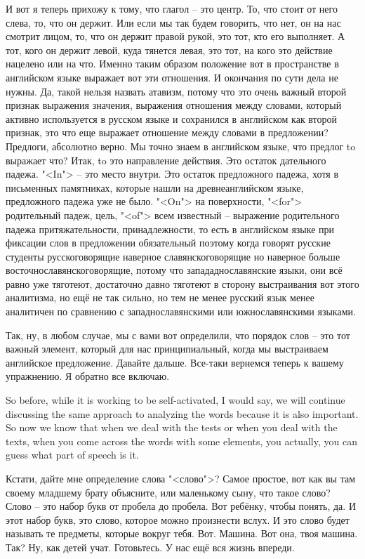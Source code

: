\documentclass[main.tex]{subfiles}
\begin{document}
И вот я теперь прихожу к тому, что глагол -- это центр.
То, что стоит от него слева, то, что он держит.
Или если мы так будем говорить, что нет, он на нас смотрит лицом, то, что он держит правой рукой, это тот, кто его выполняет.
А тот, кого он держит левой, куда тянется левая, это тот, на кого это действие нацелено или на что.
Именно таким образом положение вот в пространстве в английском языке выражает вот эти отношения.
И окончания по сути дела не нужны.
Да, такой нельзя назвать атавизм, потому что это очень важный второй признак выражения значения, выражения отношения между словами, который активно используется в русском языке и сохранился в английском как второй признак, это что еще выражает отношение между словами в предложении?
Предлоги, абсолютно верно.
Мы точно знаем в английском языке, что предлог to выражает что? 
Итак, to это направление действия.
Это остаток дательного падежа.
"<In"> -- это место внутри.
Это остаток предложного падежа, хотя в письменных памятниках, которые нашли на древнеанглийском языке, предложного падежа уже не было.
"<On"> на поверхности, "<for"> родительный падеж, цель, "<of"> всем известный -- выражение родительного падежа притяжательности, принадлежности, то есть в английском языке при фиксации слов в предложении обязательный поэтому когда говорят русские студенты русскоговорящие наверное славянскоговорящие но наверное больше восточнославянскоговорящие, потому что запададнославянские языки, они всё равно уже тяготеют, достаточно давно тяготеют в сторону выстраивания вот этого аналитизма, но ещё не так сильно, но тем не менее русский язык менее аналитичен по сравнению с западнославянскими или южнославянскими языками.

Так, ну, в любом случае, мы с вами вот определили, что порядок слов – это тот важный элемент, который для нас принципиальный, когда мы выстраиваем английское предложение.
Давайте дальше.
Все-таки вернемся теперь к вашему упражнению.
Я обратно все включаю.

So before, while it is working to be self-activated, I would say, we will continue discussing the same approach to analyzing the words because it is also important.
So now we know that when we deal with the tests or when you deal with the texts, when you come across the words with some elements, you actually, you can guess what part of speech is it.

Кстати, дайте мне определение слова "<слово">?
Самое простое, вот как вы там своему младшему брату объясните, или маленькому сыну, что такое слово?
Слово -- это набор букв от пробела до пробела.
Вот ребёнку, чтобы понять, да.
И этот набор букв, это слово, которое можно произнести вслух.
И это слово будет называть те предметы, которые вокруг тебя.
Вот.
Машина.
Вот она, твоя машина.
Так? Ну, как детей учат.
Готовьтесь. У нас ещё вся жизнь впереди.
\end{document}
